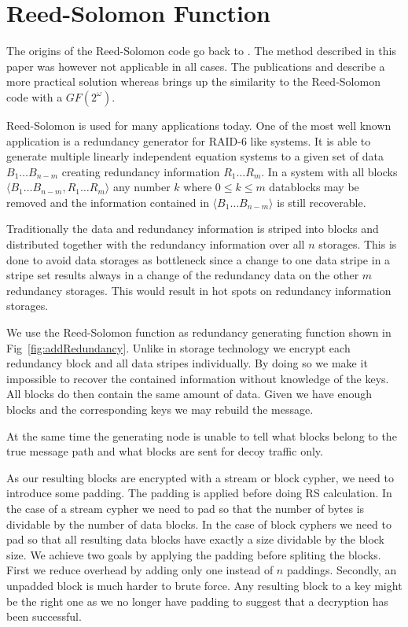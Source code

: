\documentclass[9pt,journal,compsoc]{IEEEtran}
\begin{document}
\newpage
\appendices

\section{Reed-Solomon Function\label{sec:reedSolomon}}
The origins of the Reed-Solomon code go back to \cite{reed1960polynomial}. The method described in this paper was however not applicable in all cases. The publications \cite{karnin1983secret} and \cite{Rabin:1989:EDI:62044.62050} describe a more practical solution whereas \cite{preparata1989holographic} brings up the similarity to the Reed-Solomon code with a $GF(2^\omega)$. 

Reed-Solomon is used for many applications today. One of the most well known application is a redundancy generator for RAID-6 like systems. It is able to generate multiple linearly independent equation systems to a given set of data $B_1\ldots B_{n-m}$ creating redundancy information $R_1\ldots R_m$. In a system with all blocks $\langle B_1\ldots B_{n-m}, R_1\ldots R_m \rangle$ any number $k$ where $0\le k\le m$ datablocks may be removed and the information contained in $\langle B_1\ldots B_{n-m}\rangle$ is still recoverable. 

Traditionally the data and redundancy information is striped into blocks and distributed together with the redundancy information over all $n$ storages. This is done to avoid data storages as bottleneck since a change to one data stripe  in a stripe set results always in a change of the redundancy data on the other $m$ redundancy storages. This would result in hot spots on redundancy information storages.

We use the Reed-Solomon function as redundancy generating function shown in Fig~\ref{fig:addRedundancy}. Unlike in storage technology we encrypt each redundancy block and all data stripes individually. By doing so we make it impossible to recover the contained information without knowledge of the keys. All blocks do then contain the same amount of data. Given we have enough blocks and the corresponding keys we may rebuild the message. 

At the same time the generating node is unable to tell what blocks belong to the true message path and what blocks are sent for decoy traffic only. 

As our resulting blocks are encrypted with a stream or block cypher, we need to introduce some padding. The padding is applied before doing RS calculation. In the case of a stream cypher we need to pad so that the number of bytes is dividable by the number of data blocks. In the case of block cyphers we need to pad so that all resulting data blocks have exactly a size dividable by the block size. We achieve two goals by applying the padding before spliting the blocks. First we reduce overhead by adding only one instead of $n$ paddings. Secondly, an unpadded block is much harder to brute force. Any resulting block to a key might be the right one as we no longer have padding to suggest that a decryption has been successful.
\end{document}
